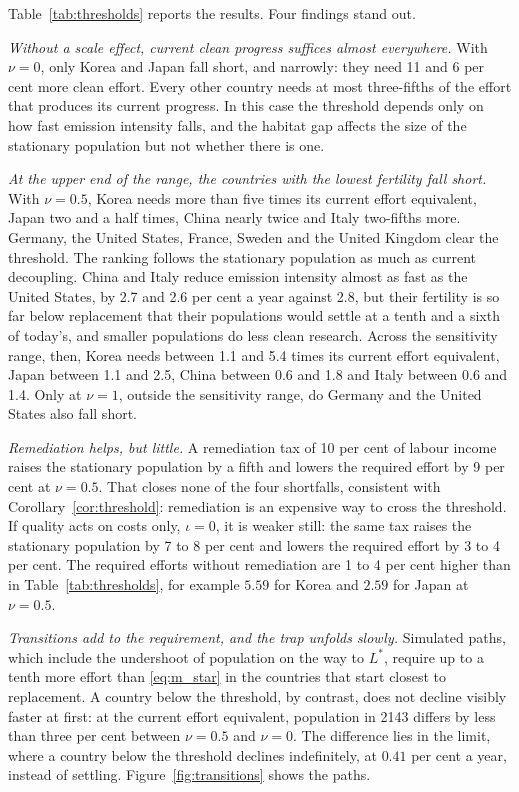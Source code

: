 \documentclass[11pt]{article}
\begin{document}
Table~\ref{tab:thresholds} reports the results. Four findings stand out.

\emph{Without a scale effect, current clean progress suffices almost everywhere.} With $\nu=0$, only Korea
and Japan fall short, and narrowly: they need 11 and 6 per cent more clean effort. Every other country
needs at most three-fifths of the effort that produces its current progress. In this case the threshold
depends only on how fast emission intensity falls, and the habitat gap affects the size of the
stationary population but not whether there is one.

\emph{At the upper end of the range, the countries with the lowest fertility fall short.} With $\nu=0.5$,
Korea needs more than five times its current effort equivalent, Japan two and a half times, China nearly twice
and Italy two-fifths more. Germany, the United States, France, Sweden and the United Kingdom clear the
threshold. The ranking follows the stationary population as much as current decoupling. China and Italy
reduce emission intensity almost as fast as the United States, by 2.7 and 2.6 per cent a year against
2.8, but their fertility is so far below replacement that their populations would settle at a tenth and a
sixth of today's, and smaller populations do less clean research. Across the sensitivity range, then,
Korea needs between 1.1 and 5.4 times its current effort equivalent, Japan between 1.1 and 2.5, China between 0.6
and 1.8 and Italy between 0.6 and 1.4. Only at $\nu=1$, outside the sensitivity range, do Germany and the United States also fall
short.

\emph{Remediation helps, but little.} A remediation tax of 10 per cent of labour income raises the
stationary population by a fifth and lowers the required effort by 9 per cent at $\nu=0.5$. That closes
none of the four shortfalls, consistent with Corollary~\ref{cor:threshold}: remediation is an expensive way
to cross the threshold. If quality acts on costs only, $\iota=0$, it is weaker still: the same tax raises
the stationary population by 7 to 8 per cent and lowers the required effort by 3 to 4 per cent. The
required efforts without remediation are 1 to 4 per cent higher than in Table~\ref{tab:thresholds}, for
example $5.59$ for Korea and $2.59$ for Japan at $\nu=0.5$.

\emph{Transitions add to the requirement, and the trap unfolds slowly.} Simulated paths, which include
the undershoot of population on the way to $L^\ast$, require up to a tenth more effort than
\eqref{eq:m_star} in the countries that start closest to replacement. A country below the threshold,
by contrast, does not decline visibly faster at first: at the current effort equivalent, population in 2143 differs
by less than three per cent between $\nu=0.5$ and $\nu=0$. The difference lies in the limit, where a country
below the threshold declines indefinitely, at $0.41$ per cent a year, instead of settling.
Figure~\ref{fig:transitions} shows the paths.
\end{document}
